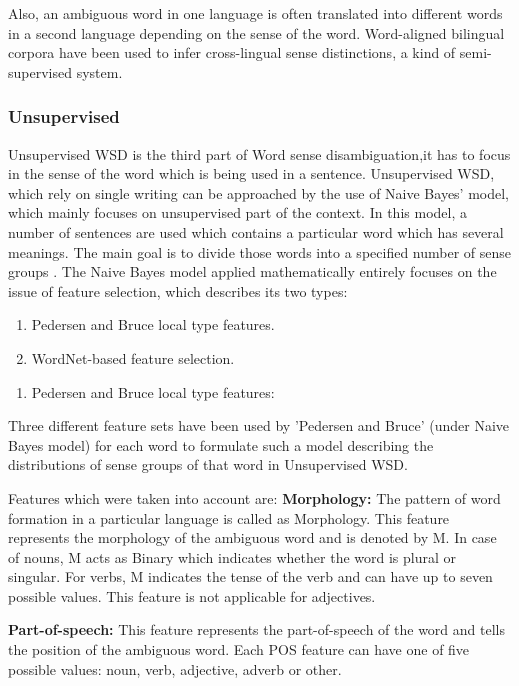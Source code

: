 Also, an ambiguous word in one language is often translated into different words in a second language depending on the sense 
of the word. 
Word-aligned bilingual corpora have been used to infer cross-lingual sense distinctions, a kind of semi-supervised system\cite{Cheslow2014}.

\subsubsection*{Unsupervised}
Unsupervised WSD is the third part of Word sense disambiguation,it has to focus in the sense of the word which is being used 
in a sentence.  
Unsupervised WSD, which rely on single writing can be approached by the use of Naive Bayes' model, which mainly focuses on unsupervised part of the context. 
In this model, a number of sentences are used which contains a particular word which has several meanings. 
The main goal is to divide those words into a specified number of sense groups \cite{4028513}.
The Naive Bayes model applied mathematically entirely focuses on the issue of feature selection, which describes its two types:

\begin{enumerate}
	\item Pedersen and Bruce local type features.
	\item WordNet-based feature selection.
\end{enumerate}

\begin{enumerate}
	\item Pedersen and Bruce local type features:
\end{enumerate}
Three different feature sets have been used by 'Pedersen and Bruce' (under Naive Bayes model) for each word to formulate such 
a model describing the distributions of sense groups of that word in Unsupervised WSD.

Features which were taken into account are:
\textbf{Morphology:} The pattern of word formation in a particular language is called as Morphology.
This feature represents the morphology \cite{5494927} of the ambiguous word and is denoted by M. 
In case of nouns, M acts as Binary which indicates whether the word is plural or singular.
For verbs, M indicates the tense of the verb and can have up to seven possible values.
This feature is not applicable for adjectives.

\textbf{Part-of-speech:} This feature represents the part-of-speech \cite{6982457} of the word and tells the position of the ambiguous word.
Each POS feature can have one of five possible values: noun, verb, adjective, adverb or other.

